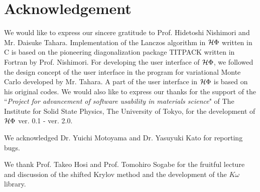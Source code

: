\chapter{Acknowledgement}
We would like to express our sincere gratitude to Prof. Hidetoshi Nishimori and Mr. Daisuke Tahara.
Implementation of the Lanczos algorithm in $\mathcal{H} \Phi$ written in C is based on the
pioneering diagonalization package TITPACK written in Fortran by Prof. Nishimori.
For developing the user interface of $\mathcal{H} \Phi$, we followed the design concept of
the user interface in the program for variational Monte Carlo developed by Mr. Tahara.
A part of the user interface in $\mathcal{H} \Phi$ is based on his original codes.
We would also like to express our thanks for the support of the ``{\it Project for advancement of software usability in materials science}" 
of The Institute for Solid State Physics, The University of Tokyo, for the development of $\mathcal{H} \Phi$ ver. 0.1 - ver. 2.0.

We acknowledged Dr. Yuichi Motoyama and Dr. Yasuyuki Kato for reporting bugs.

We thank Prof. Takeo Hosi and Prof. Tomohiro Sogabe for the fruitful lecture and discussion of the shifted Krylov method and the development of the $K\omega$ library.

